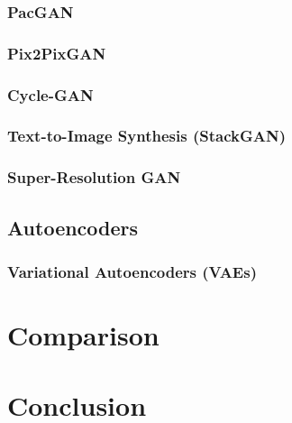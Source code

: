 \documentclass[conference]{IEEEtran}
\begin{document}
\subsubsection{PacGAN}

\subsubsection{Pix2PixGAN}

\subsubsection{Cycle-GAN}

\subsubsection{Text-to-Image Synthesis (StackGAN)}

\subsubsection{Super-Resolution GAN}

\subsection{Autoencoders}

\subsubsection{Variational Autoencoders (VAEs)}

\section{Comparison}
\label{comparison}

\section{Conclusion}
\label{conclusion}
\end{document}
